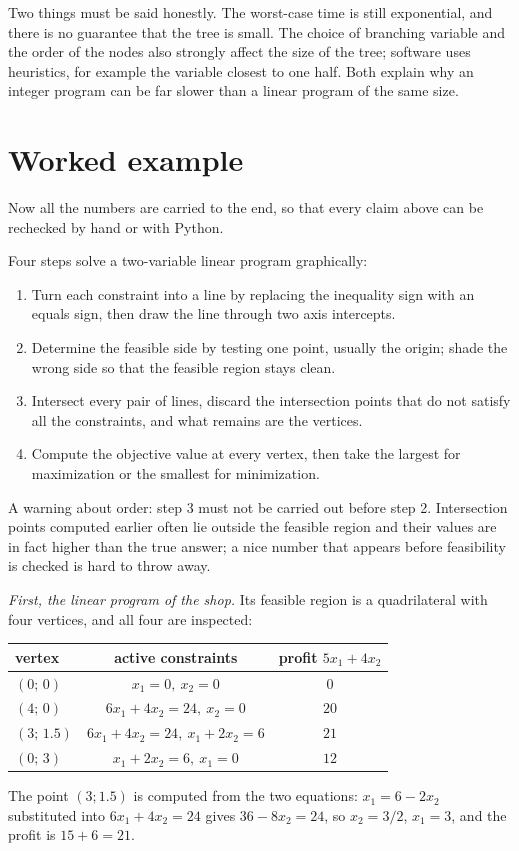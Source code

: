 Two things must be said honestly. The worst-case time is still exponential, and there is no
guarantee that the tree is small. The choice of branching variable and the order of the nodes
also strongly affect the size of the tree; software uses heuristics, for example the variable
closest to one half. Both explain why an integer program can be far slower than a linear program
of the same size.

\section{Worked example}

Now all the numbers are carried to the end, so that every claim above can be
rechecked by hand or with Python.

\begin{resep}
Four steps solve a two-variable linear program graphically:
\begin{enumerate}
  \item Turn each constraint into a line by replacing the inequality sign with an equals sign,
        then draw the line through two axis intercepts.
  \item Determine the feasible side by testing one point, usually the origin; shade the wrong
        side so that the feasible region stays clean.
  \item Intersect every pair of lines, discard the intersection points that do not satisfy all
        the constraints, and what remains are the vertices.
  \item Compute the objective value at every vertex, then take the largest for maximization or
        the smallest for minimization.
\end{enumerate}
A warning about order: step 3 must not be carried out before step 2. Intersection points
computed earlier often lie outside the feasible region and their values are in fact higher than
the true answer; a nice number that appears before feasibility is checked is hard to throw away.
\end{resep}

\emph{First, the linear program of the shop.} Its feasible region is a quadrilateral with four
vertices, and all four are inspected:
\begin{center}
\begin{tabular}{lcc}
\hline
vertex & active constraints & profit $5x_{1}+4x_{2}$ \\
\hline
$(0;\,0)$ & $x_{1}=0,\ x_{2}=0$ & $0$ \\
$(4;\,0)$ & $6x_{1}+4x_{2}=24,\ x_{2}=0$ & $20$ \\
$(3;\,1.5)$ & $6x_{1}+4x_{2}=24,\ x_{1}+2x_{2}=6$ & $21$ \\
$(0;\,3)$ & $x_{1}+2x_{2}=6,\ x_{1}=0$ & $12$ \\
\hline
\end{tabular}
\end{center}
The point $(3;1.5)$ is computed from the two equations: $x_{1}=6-2x_{2}$ substituted into
$6x_{1}+4x_{2}=24$ gives $36-8x_{2}=24$, so $x_{2}=3/2$, $x_{1}=3$, and the profit is
$15+6=21$.


